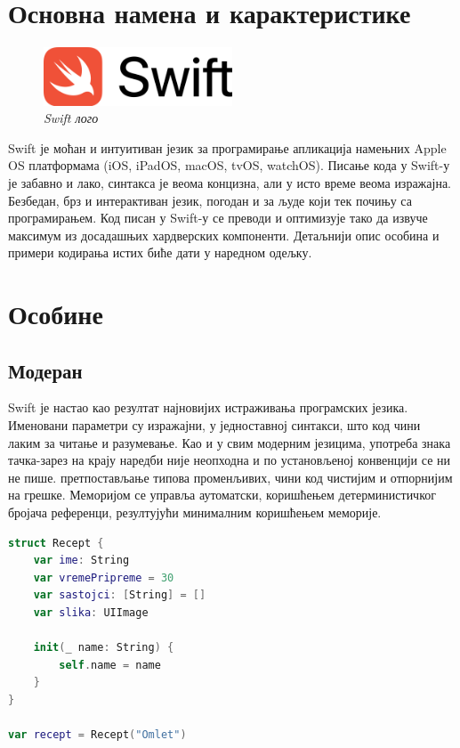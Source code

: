 \documentclass[12pt,oneside]{memoir}
\begin{document}
\section{Основна намена и карактеристике}


\begin{figure}[H]
\includegraphics[width=0.5\textwidth]{images/Swift_logo.png}
\centering
\caption{\textit{Swift лого}}
\label{slika:swift_logo}
\end{figure}

\indent Swift је моћан и интуитиван језик за програмирање апликација намењних Apple OS платформама (iOS, iPadOS, macOS, tvOS, watchOS). Писање кода у Swift-у је забавно и лако, синтакса је веома концизна, али у исто време веома изражајна. Безбедан, брз и интерактиван језик, погодан и за људе који тек почињу са програмирањем. Код писан у Swift-у се преводи и оптимизује тако да извуче максимум из досадашњих хардверских компоненти. 
Детаљнији опис особина и примери кодирања истих биће дати у наредном одељку. 

\section{Особине}

\subsection{Модеран}
\label{sec:Модеран}

\indent Swift је настао као резултат најновијих истраживања програмских језика.
Именовани параметри су изражајни, у једноставној синтакси, што код чини лаким за читање и разумевање. Као и у свим модерним језицима, употреба знака тачка-зарез на крају наредби није неопходна и по установљеној конвенцији се ни не пише. претпостављање типова променљивих, чини код чистијим и отпорнијим на грешке. Меморијом се управља аутоматски, коришћењем детерминистичког бројача референци, резултујући минималним коришћењем меморије.

\newpage %

\begin{lstlisting}[caption=\textit{{Декларација нове структуре, уз приказ иницијализације без навођења конкретног типа}}, label={lst:Декларација}, language=Swift, frame=single]
struct Recept {
    var ime: String
    var vremePripreme = 30
    var sastojci: [String] = []
    var slika: UIImage

    init(_ name: String) {
        self.name = name
    }
}

var recept = Recept("Omlet")

\end{lstlisting}
\end{document}
